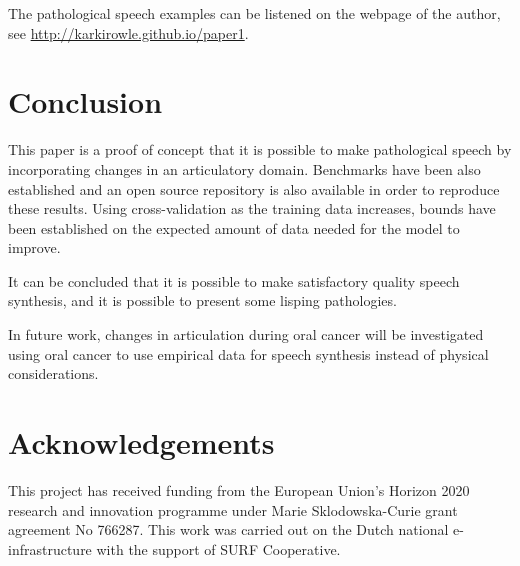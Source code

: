 \documentclass[a4paper]{article}
\begin{document}
The pathological speech examples can be listened on the webpage of the
author, see \url{http://karkirowle.github.io/paper1}.  

\section{Conclusion}

This paper is a proof of concept that it is possible to make pathological
speech by incorporating changes in an articulatory domain. Benchmarks
have been also established and an open source repository is also available
in order to reproduce these results. Using cross-validation as the
training data increases, bounds have been established on the expected
amount of data needed for the model to improve.

It can be concluded that it is possible to make satisfactory quality
speech synthesis, and it is possible to present some lisping pathologies.

In future work, changes in articulation during oral cancer will be
investigated using oral cancer to use empirical data for speech synthesis
instead of physical considerations.

\section{Acknowledgements}
This project has received funding from the European Union's Horizon
2020 research and innovation programme under Marie Sklodowska-Curie
grant agreement No 766287.
This work was carried out on the Dutch national e-infrastructure with the support of SURF Cooperative.




\end{document}
